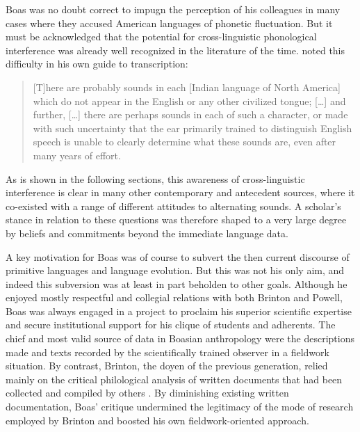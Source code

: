 \documentclass[output=paper]{langscibook}
\begin{document}
Boas was no doubt correct to impugn the perception of his colleagues in many cases where they accused American languages of phonetic fluctuation. But it must be acknowledged that the potential for cross-linguistic phonological interference was already well recognized in the literature of the time. \citet[2]{Powell18801877} noted this difficulty in his own guide to transcription:

\begin{quotation}
[T]here are probably sounds in each [Indian language of North America] which do not appear in the English or any other civilized tongue; […] and further, […] there are perhaps sounds in each of such a character, or made with such uncertainty that the ear primarily trained to distinguish English speech is unable to clearly determine what these sounds are, even after many years of effort. \citep[2]{Powell18801877}
\end{quotation}

As is shown in the following sections, this awareness of cross-linguistic interference is clear in many other contemporary and antecedent sources, where it co-existed with a range of different attitudes to alternating sounds. A scholar's stance in relation to these questions was therefore shaped to a very large degree by beliefs and commitments beyond the immediate language data.

A key motivation for Boas was of course to subvert the then current discourse of primitive languages and language evolution. But this was not his only aim, and indeed this subversion was at least in part beholden to other goals. Although he enjoyed mostly respectful and collegial relations with both Brinton and Powell, Boas was always engaged in a project to proclaim his superior scientific expertise and secure institutional support for his clique of students and adherents. The chief and most valid source of data in Boasian anthropology were the descriptions made and texts recorded by the scientifically trained observer in a fieldwork situation. By contrast, Brinton, the doyen of the previous generation, relied mainly on the critical philological analysis of written documents that had been collected and compiled by others \citep[see][21--24]{Darnell1988}. By diminishing existing written documentation, Boas' critique undermined the legitimacy of the mode of research employed by Brinton and boosted his own fieldwork-oriented approach.
\end{document}
